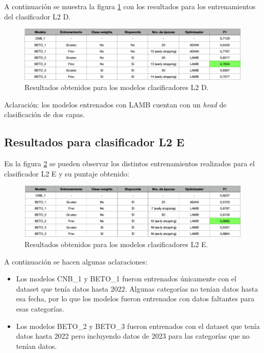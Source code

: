 A continuación se muestra la figura \ref{fig:res-l2d} con los resultados para los entrenamientos del clasificador L2 D.

\begin{figure}[htbp]
	\centering
	\includegraphics[width=1\textwidth]{./Figures/cap4-resultados-l2d.png}
	\caption{Resultados obtenidos para los modelos clasificadores L2 D.}
	\label{fig:res-l2d}
\end{figure}

Aclaración: los modelos entrenados con LAMB cuentan con un \textit{head} de clasificación de dos capas.

\subsection{Resultados para clasificador L2 E}

En la figura \ref{fig:res-l2e} se pueden observar los distintos entrenamientos realizados para el clasificador L2 E y su puntaje obtenido:

\begin{figure}[htbp]
	\centering
	\includegraphics[width=1\textwidth]{./Figures/cap4-resultados-l2e.png}
	\caption{Resultados obtenidos para los modelos clasificadores L2 E.}
	\label{fig:res-l2e}
\end{figure}

A continuación se hacen algunas aclaraciones:
\begin{itemize}
	\item Los modelos CNB\_1 y BETO\_1 fueron entrenados únicamente con el dataset que tenía datos hasta 2022. Algunas categorías no tenían datos hasta esa fecha, por lo que los modelos fueron entrenados con datos faltantes para esas categorías.
	\item Los modelos BETO\_2 y BETO\_3 fueron entrenados con el dataset que tenía datos hasta 2022 pero incluyendo datos de 2023 para las categorías que no tenían datos.
\end{itemize}

